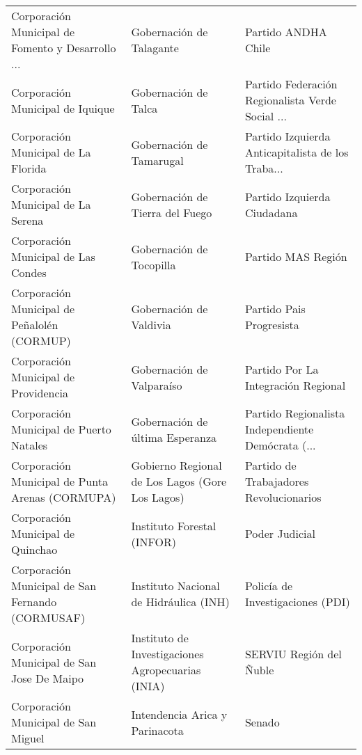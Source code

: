 \documentclass[11pt]{article}
\begin{document}
\begin{longtable}{ p{5cm} | p{5cm} | p{5cm} }
 Corporación Municipal de Fomento y Desarrollo ... &                           Gobernación de Talagante &                                Partido ANDHA Chile \\
                  Corporación Municipal de Iquique &                               Gobernación de Talca &  Partido Federación Regionalista Verde Social  ... \\
               Corporación Municipal de La Florida &                           Gobernación de Tamarugal &  Partido Izquierda Anticapitalista de los Traba... \\
                Corporación Municipal de La Serena &                    Gobernación de Tierra del Fuego &                        Partido Izquierda Ciudadana \\
               Corporación Municipal de Las Condes &                           Gobernación de Tocopilla &                                 Partido MAS Región \\
       Corporación Municipal de Peñalolén (CORMUP) &                            Gobernación de Valdivia &                           Partido Pais Progresista \\
              Corporación Municipal de Providencia &                          Gobernación de Valparaíso &                Partido Por La Integración Regional \\
           Corporación Municipal de Puerto Natales &                    Gobernación de última Esperanza &  Partido Regionalista Independiente Demócrata (... \\
   Corporación Municipal de Punta Arenas (CORMUPA) &    Gobierno Regional de Los Lagos (Gore Los Lagos) &            Partido de Trabajadores Revolucionarios \\
                 Corporación Municipal de Quinchao &                         Instituto Forestal (INFOR) &                                     Poder Judicial \\
  Corporación Municipal de San Fernando (CORMUSAF) &             Instituto Nacional de Hidráulica (INH) &                   Policía de Investigaciones (PDI) \\
        Corporación Municipal de San Jose De Maipo &  Instituto de Investigaciones Agropecuarias (INIA) &                            SERVIU Región del Ñuble \\
               Corporación Municipal de San Miguel &                     Intendencia Arica y Parinacota &                                             Senado \\

\end{longtable}
\end{document}
